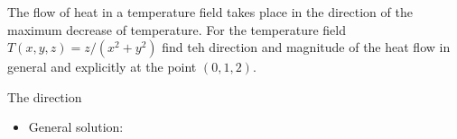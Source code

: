 The flow of heat in a temperature field takes place in the direction of the maximum decrease of temperature. For the temperature field $T\left(x,y,z\right)=z/\left(x^2+y^2\right)$ find teh direction and magnitude of the heat flow in general and explicitly at the point $\left(0,1,2\right)$.

The direction 
\begin{itemize}
	\item General solution:
		
\end{itemize}
